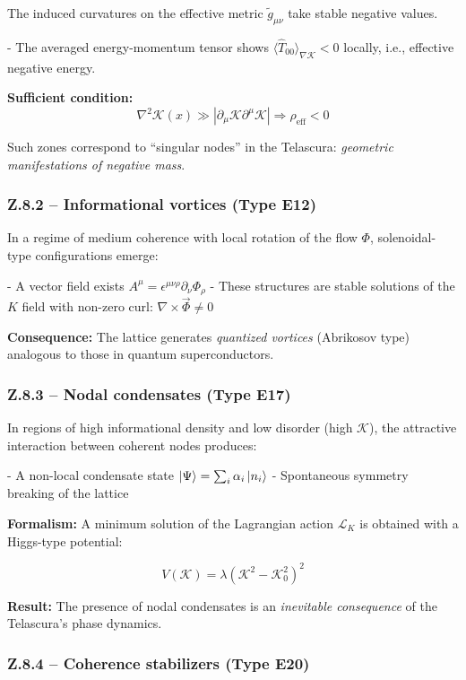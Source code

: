\documentclass[12pt]{article}
\begin{document}
The induced curvatures on the effective metric $\tilde{g}_{\mu\nu}$ take stable negative values.

- The averaged energy-momentum tensor shows $\langle \hat{T}_{00} \rangle_{\nabla \mathcal{K}} < 0$ locally, i.e., effective negative energy.

\textbf{Sufficient condition:}
\[
\nabla^2 \mathcal{K}(x) \gg \left|\partial_\mu \mathcal{K} \partial^\mu \mathcal{K}\right| \Rightarrow \rho_{\text{eff}} < 0
\]

Such zones correspond to “singular nodes” in the Telascura: \emph{geometric manifestations of negative mass}.

\subsubsection*{Z.8.2 – Informational vortices (Type E12)}

In a regime of medium coherence with local rotation of the flow $\Phi$, solenoidal-type configurations emerge:

- A vector field exists $A^\mu = \epsilon^{\mu\nu\rho} \partial_\nu \Phi_\rho$
- These structures are stable solutions of the $K$ field with non-zero curl: $\nabla \times \vec{\Phi} \neq 0$

\textbf{Consequence:} The lattice generates \emph{quantized vortices} (Abrikosov type) analogous to those in quantum superconductors.

\subsubsection*{Z.8.3 – Nodal condensates (Type E17)}

In regions of high informational density and low disorder (high $\mathcal{K}$), the attractive interaction between coherent nodes produces:

- A non-local condensate state $\ket{\Psi} = \sum_i \alpha_i \ket{n_i}$
- Spontaneous symmetry breaking of the lattice

\textbf{Formalism:} A minimum solution of the Lagrangian action $\mathcal{L}_K$ is obtained with a Higgs-type potential:

\[
V(\mathcal{K}) = \lambda(\mathcal{K}^2 - \mathcal{K}_0^2)^2
\]

\textbf{Result:} The presence of nodal condensates is an \emph{inevitable consequence} of the Telascura’s phase dynamics.

\subsubsection*{Z.8.4 – Coherence stabilizers (Type E20)}
\end{document}
